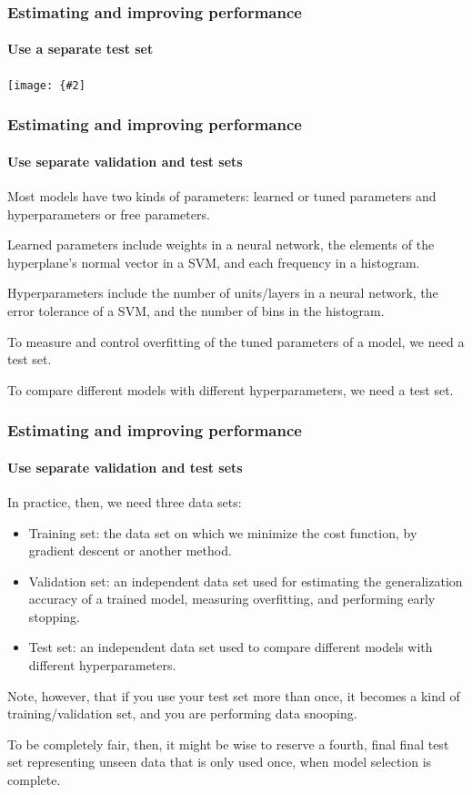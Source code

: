 \documentclass[aspectratio=169]{beamer}
\newcommand{\myfig}[3]{\centerline{\texttt{[image: \{\#2]}}}
\begin{document}
\begin{frame}
\frametitle{Estimating and improving performance}
\framesubtitle{Use a separate test set}

\myfig{3.5in}{error}{}

\end{frame}


\begin{frame}
\frametitle{Estimating and improving performance}
\framesubtitle{Use separate validation and test sets}

Most models have two kinds of parameters: \alert{learned} or
\alert{tuned} parameters and \alert{hyperparameters} or \alert{free
  parameters}.

\medskip

Learned parameters include weights in a neural network, the elements
of the hyperplane's normal vector in a SVM, and each frequency in a
histogram.

\medskip

Hyperparameters include the number of units/layers in a neural network,
the error tolerance of a SVM, and the number of bins in the histogram.

\medskip

To \alert{measure and control overfitting} of the tuned parameters of
a model, \alert{we need a test set}.

\medskip

To \alert{compare different models with different hyperparameters},
\alert{we need a test set}.

\end{frame}


\begin{frame}
\frametitle{Estimating and improving performance}
\framesubtitle{Use separate validation and test sets}

In practice, then, we need \alert{three data sets}:
\begin{itemize}
\item \alert{Training set}: the data set on which we minimize the cost function,
  by gradient descent or another method.
\item \alert{Validation set}: an independent data set used for estimating
  the generalization accuracy of a trained model, measuring overfitting,
  and performing early stopping.
\item \alert{Test set}: an independent data set used to compare
  different models with different hyperparameters.
\end{itemize}

\medskip

Note, however, that if you use your test set more than once, it
becomes a kind of training/validation set, and you are performing
\alert{data snooping}.

\medskip

To be completely fair, then, it might be wise to reserve a fourth,
\alert{final final test set} representing unseen data that is
\alert{only used once}, when model selection is complete.

\end{frame}
\end{document}
